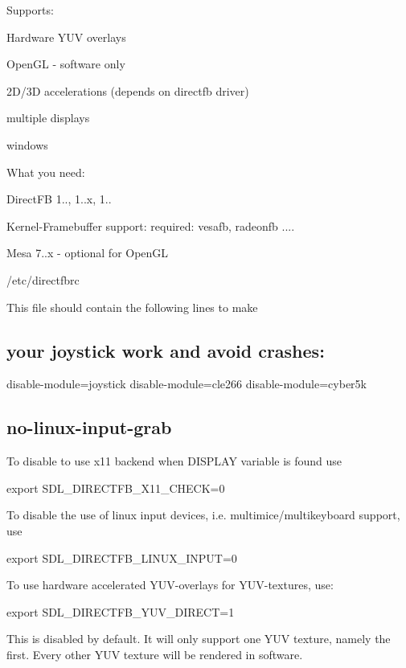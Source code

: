 Supports\+:


\begin{DoxyItemize}
\item Hardware Y\+UV overlays
\item Open\+GL -\/ software only
\item 2\+D/3D accelerations (depends on directfb driver)
\item multiple displays
\item windows
\end{DoxyItemize}

What you need\+:


\begin{DoxyItemize}
\item Direct\+FB 1.., 1..\+x, 1..
\item Kernel-\/\+Framebuffer support\+: required\+: vesafb, radeonfb ....
\item Mesa 7..\+x -\/ optional for Open\+GL
\end{DoxyItemize}

/etc/directfbrc

This file should contain the following lines to make \subsection*{your joystick work and avoid crashes\+: }

disable-\/module=joystick disable-\/module=cle266 disable-\/module=cyber5k \subsection*{no-\/linux-\/input-\/grab }

To disable to use x11 backend when D\+I\+S\+P\+L\+AY variable is found use

export S\+D\+L\+\_\+\+D\+I\+R\+E\+C\+T\+F\+B\+\_\+\+X11\+\_\+\+C\+H\+E\+CK=0

To disable the use of linux input devices, i.\+e. multimice/multikeyboard support, use

export S\+D\+L\+\_\+\+D\+I\+R\+E\+C\+T\+F\+B\+\_\+\+L\+I\+N\+U\+X\+\_\+\+I\+N\+P\+UT=0

To use hardware accelerated Y\+U\+V-\/overlays for Y\+U\+V-\/textures, use\+:

export S\+D\+L\+\_\+\+D\+I\+R\+E\+C\+T\+F\+B\+\_\+\+Y\+U\+V\+\_\+\+D\+I\+R\+E\+CT=1

This is disabled by default. It will only support one Y\+UV texture, namely the first. Every other Y\+UV texture will be rendered in software.

